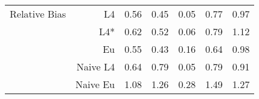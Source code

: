 \documentclass[a4paper,12pt,twoside]{book}
\begin{document}
\begin{table}[H]
\begin{tabular}{crrrrrr}
   \hline
   
{\color{blue} Relative Bias } & L4  &0.56 & 0.45 & 0.05 & 0.77 & 0.97 \\ 
  
&L4*  &0.62 & 0.52 & 0.06 & 0.79 & 1.12 \\ 
 
 
  
&Eu &  
    0.55 & 0.43 & 0.16 & 0.64 & 0.98 \\ 
  
&Naive L4&  
  
  0.64 & 0.79 & 0.05 & 0.79 & 0.91 \\ 
  
  
&Naive Eu &  
  1.08 & 1.26 & 0.28 & 1.49 & 1.27 \\ 
  
  
\end{tabular}

\end{table}
\end{document}
